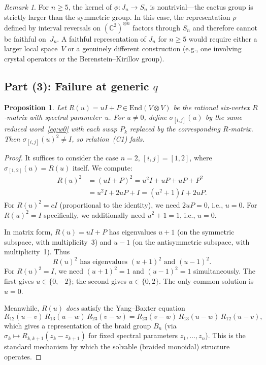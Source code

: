 \documentclass[11pt]{article}
\newtheorem{proposition}[theorem]{Proposition}
\theoremstyle{remark}
\newtheorem{remark}[theorem]{Remark}
\newcommand{\CC}{\mathbb{C}}
\begin{document}
\begin{remark}
For $n \geq 5$, the kernel of $\phi\colon J_n \to S_n$ is nontrivial---the
cactus group is strictly larger than the symmetric group. In this case,
the representation $\rho$ defined by interval reversals on $(\CC^2)^{\otimes n}$
factors through $S_n$ and therefore cannot be faithful on~$J_n$. A faithful
representation of $J_n$ for $n \geq 5$ would require either a larger local
space~$V$ or a genuinely different construction (e.g., one involving crystal
operators or the Berenstein--Kirillov group).
\end{remark}

\subsection{Part (3): Failure at generic $q$}

\begin{proposition}\label{prop:failure}
Let $R(u) = uI + P \in \mathrm{End}(V \otimes V)$ be the rational
six-vertex $R$-matrix with spectral parameter~$u$. For $u \neq 0$,
define $\sigma_{[i,j]}(u)$ by the same reduced word~\eqref{eq:w0} with
each swap $P_k$ replaced by the corresponding $R$-matrix. Then
$\sigma_{[i,j]}(u)^2 \neq I$, so relation~(C1) fails.
\end{proposition}

\begin{proof}
It suffices to consider the case $n = 2$, $[i,j] = [1,2]$, where
$\sigma_{[1,2]}(u) = R(u)$ itself. We compute:
\begin{align*}
  R(u)^2 &= (uI + P)^2 = u^2 I + uP + uP + P^2 \\
         &= u^2 I + 2uP + I = (u^2 + 1)I + 2uP.
\end{align*}
For $R(u)^2 = cI$ (proportional to the identity), we need $2uP = 0$,
i.e., $u = 0$. For $R(u)^2 = I$ specifically, we additionally need
$u^2 + 1 = 1$, i.e., $u = 0$.

In matrix form, $R(u) = uI + P$ has eigenvalues $u + 1$ (on the symmetric
subspace, with multiplicity~3) and $u - 1$ (on the antisymmetric subspace,
with multiplicity~1). Thus
\[
  R(u)^2 \text{ has eigenvalues } (u+1)^2 \text{ and } (u-1)^2.
\]
For $R(u)^2 = I$, we need $(u+1)^2 = 1$ and $(u-1)^2 = 1$
simultaneously. The first gives $u \in \{0, -2\}$; the second gives
$u \in \{0, 2\}$. The only common solution is $u = 0$.

\medskip

Meanwhile, $R(u)$ \emph{does} satisfy the Yang--Baxter equation
\[
  R_{12}(u - v)\, R_{13}(u - w)\, R_{23}(v - w)
  = R_{23}(v - w)\, R_{13}(u - w)\, R_{12}(u - v),
\]
which gives a representation of the braid group $B_n$ (via
$\sigma_k \mapsto R_{k,k+1}(z_k - z_{k+1})$ for fixed spectral
parameters $z_1, \ldots, z_n$). This is the standard mechanism by which
the solvable (braided monoidal) structure operates.
\end{proof}
\end{document}
